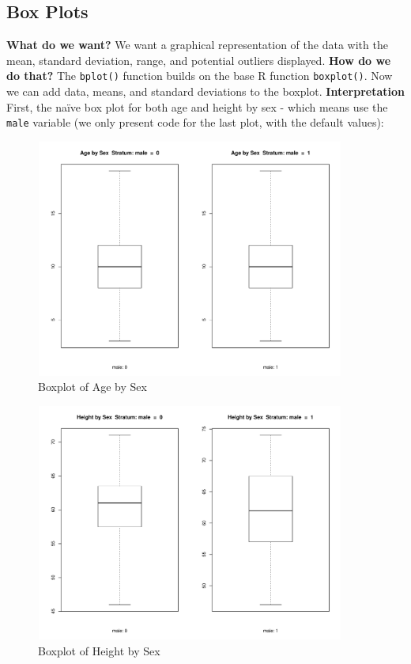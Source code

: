 \documentclass[landscape]{article}
\begin{document}
\subsection{Box Plots}
{\large \textbf{What do we want?}}\newline
We want a graphical representation of the data with the mean, standard deviation, range, and potential outliers displayed. \newline
{\large \textbf{How do we do that?}}\newline
The \texttt{bplot()} function builds on the base R function \texttt{boxplot()}. Now we can add data, means, and standard deviations to the boxplot.\newline
{\large \textbf{Interpretation}}\newline
First, the na\"ive box plot for both age and height by sex - which means use the \texttt{male} variable (we only present code for the last plot, with the default values):\\
\begin{figure}[h]
\centering
\includegraphics[width=4in, height=3.08in]{fevdoc-agebplot1}
\caption{Boxplot of Age by Sex}
\label{agebplot1}
\end{figure}
\clearpage
\begin{figure}[h]
\centering
\includegraphics[width=4in, height=3.08in]{fevdoc-heightbplot1}
\caption{Boxplot of Height by Sex}
\label{heightbplot1}
\end{figure}
\end{document}
